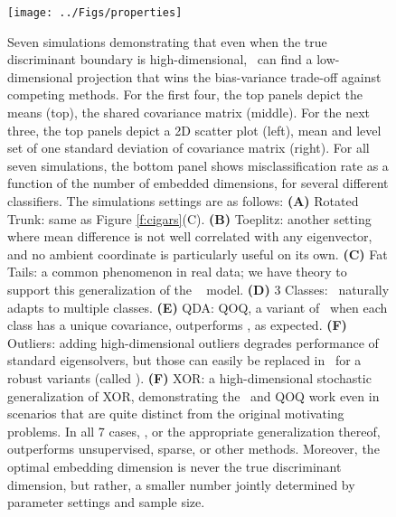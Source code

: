 \documentclass[10pt]{article}
\begin{document}
\begin{figure}[h!]
\centering
\texttt{[image: ../Figs/properties]}
\caption{
Seven simulations demonstrating that even when the true discriminant boundary is high-dimensional, \Lol~can find a low-dimensional projection that wins the bias-variance trade-off against competing methods.  
For the first four, the top panels depict the means (top), the shared covariance matrix (middle).  For the next three, the top panels depict a 2D scatter plot (left), mean and level set of one standard deviation of covariance matrix (right).  For all seven simulations, the bottom panel shows misclassification rate as a function of the number of embedded dimensions, for several different classifiers.  The simulations settings are as follows:
\textbf{(A)} Rotated Trunk: same as Figure \ref{f:cigars}(C).
\textbf{(B)} Toeplitz: another setting where mean difference is not well correlated with any eigenvector, and no ambient coordinate is particularly useful on its own.
\textbf{(C)} Fat Tails: a common phenomenon in real data; we have theory to support this generalization of the \Lda~ model.
\textbf{(D)} 3 Classes: \Lol~naturally adapts to multiple classes.
\textbf{(E)} QDA: QOQ, a variant of \Lol~when each class has a unique covariance, outperforms \Lol, as expected.
\textbf{(F)} Outliers: adding high-dimensional outliers degrades performance of standard eigensolvers, but those can easily be replaced in \Lol~for a robust variants (called \Lrl).
\textbf{(F)} XOR: a high-dimensional stochastic generalization of XOR, demonstrating the \Lol~and QOQ work even in scenarios that are quite distinct from the original motivating problems.
In all 7 cases, \Lol, or the appropriate generalization thereof, outperforms unsupervised, sparse, or other methods.  Moreover, the optimal embedding dimension is never the true discriminant dimension, but rather, a smaller number jointly determined by parameter settings and sample size.
}
\label{f:properties}
\end{figure}
\end{document}

